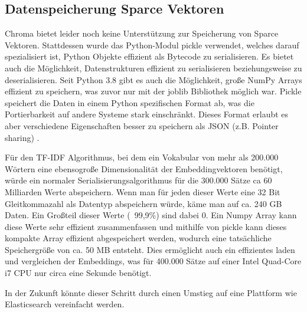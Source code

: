 \subsection{Datenspeicherung Sparce Vektoren}

Chroma bietet leider noch keine Unterstützung zur Speicherung von Sparce Vektoren.
Stattdessen wurde das Python-Modul pickle verwendet, welches darauf spezialisiert ist, Python Objekte effizient als Bytecode zu serialisieren. 
Es bietet auch die Möglichkeit, Datenstrukturen effizient zu serialisieren beziehungsweise zu deserialisieren.
Seit Python 3.8 gibt es auch die Möglichkeit, große NumPy Arrays effizient zu speichern, was zuvor nur mit der joblib Bibliothek möglich war.
Pickle speichert die Daten in einem Python spezifischen Format ab, was die Portierbarkeit auf andere Systeme stark einschränkt. 
Dieses Format erlaubt es aber verschiedene Eigenschaften besser zu speichern als JSON (z.B. Pointer sharing) \cite{pickle}.

Für den TF-IDF Algorithmus, bei dem ein Vokabular von mehr als 200.000 Wörtern eine ebensogroße Dimensionalität der Embeddingvektoren benötigt, würde ein normaler Serialisierungsalgorithmus für die 300.000 Sätze ca 60 Milliarden Werte abspeichern.
Wenn man für jeden dieser Werte eine 32 Bit Gleitkommazahl als Datentyp abspeichern würde, käme man auf ca. 240 GB Daten. 
Ein Großteil dieser Werte (~99,9\%) sind dabei 0.
Ein Numpy Array kann diese Werte sehr effizient zusammenfassen und mithilfe von pickle kann dieses kompakte Array effizient abgespeichert werden, wodurch eine tatsächliche Speichergröße von ca. 50 MB entsteht.
Dies ermöglicht auch ein effizientes laden und vergleichen der Embeddings, was für 400.000 Sätze auf einer Intel Quad-Core i7 CPU nur circa eine Sekunde benötigt.

In der Zukunft könnte dieser Schritt durch einen Umstieg auf eine Plattform wie Elasticsearch vereinfacht werden.




